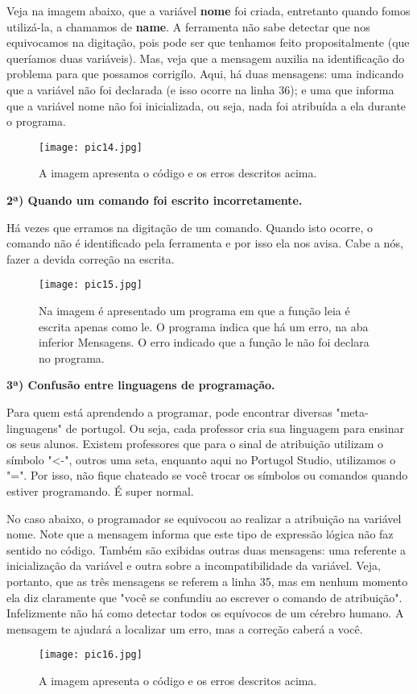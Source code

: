 \documentclass{article}
\begin{document}
{Veja na imagem abaixo, que a variável \textbf{nome} foi criada, entretanto quando fomos utilizá-la, a chamamos de \textbf{name}. A ferramenta não sabe detectar que nos equivocamos na digitação, pois pode ser que tenhamos feito propositalmente (que queríamos duas variáveis). Mas, veja que a mensagem auxilia na identificação do problema para que possamos corrigí\-lo. Aqui, há duas mensagens: uma indicando que a variável não foi declarada (e isso ocorre na linha 36); e uma que informa que a variável nome não foi inicializada, ou seja, nada foi atribuída a ela durante o programa.


\begin{figure}[H]
    \centering
    \texttt{[image: pic14.jpg]}
    \label{fig:pic14}
    \caption{A imagem apresenta o código e os erros descritos acima.}
\end{figure}


\textbf{2ª) Quando um comando foi escrito incorretamente.}

Há vezes que erramos na digitação de um comando. Quando isto ocorre, o comando não é identificado pela ferramenta e por isso ela nos avisa. Cabe a nós, fazer a devida correção na escrita.
\begin{figure}[H]
    \centering
    \texttt{[image: pic15.jpg]}
    \label{fig:pic15}
    \caption{Na imagem é apresentado um programa em que a função leia é escrita apenas como le. O programa indica que há um erro, na aba inferior Mensagens. O erro indicado que a função le não foi declara no programa.}
\end{figure}


\textbf{3ª) Confusão entre linguagens de programação.}

Para quem está aprendendo a programar, pode encontrar diversas "meta-linguagens" de portugol. Ou seja, cada professor cria sua linguagem para ensinar os seus alunos. Existem professores que para o sinal de atribuição utilizam o símbolo "<-", outros uma seta, enquanto aqui no Portugol Studio, utilizamos o "=". Por isso, não fique chateado se você trocar os símbolos ou comandos quando estiver programando. É super normal.

No caso abaixo, o programador se equivocou ao realizar a atribuição na variável nome. Note que a mensagem informa que este tipo de expressão lógica não faz sentido no código. Também são exibidas outras duas mensagens: uma referente a inicialização da variável e outra sobre a incompatibilidade da variável. Veja, portanto, que as três mensagens se referem a linha 35, mas em nenhum momento ela diz claramente que "você se confundiu ao escrever o comando de atribuição". Infelizmente não há como detectar todos os equívocos de um cérebro humano. A mensagem te ajudará a localizar um erro, mas a correção caberá a você.
\begin{figure}[H]
    \centering
    \texttt{[image: pic16.jpg]}
    \label{fig:pic16}
    \caption{A imagem apresenta o código e os erros descritos acima.}
\end{figure}


}
\end{document}
